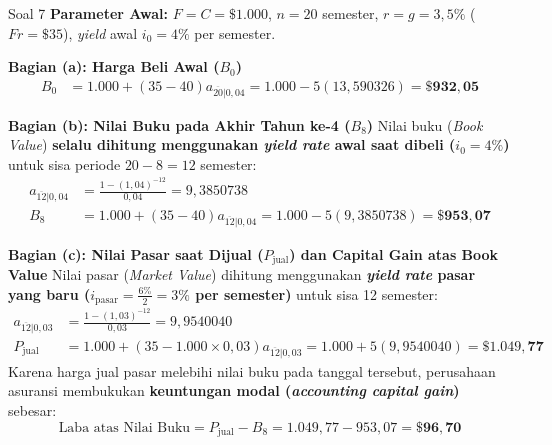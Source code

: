 \documentclass[11pt,a4paper]{article}
\begin{document}
\begin{solutionbox}{Soal 7}
\textbf{Parameter Awal:} $F = C = \$1.000$, $n = 20$ semester, $r = g = 3{,}5\%$ ($Fr = \$35$), \textit{yield} awal $i_0 = 4\%$ per semester.

\textbf{Bagian (a): Harga Beli Awal ($B_0$)}
\begin{align*}
    B_0 &= 1.000 + (35 - 40) a_{\overline{20}|0{,}04} = 1.000 - 5(13{,}590326) = \mathbf{\$932{,}05}
\end{align*}

\textbf{Bagian (b): Nilai Buku pada Akhir Tahun ke-4 ($B_8$)}
Nilai buku (\textit{Book Value}) \textbf{selalu dihitung menggunakan \textit{yield rate} awal saat dibeli ($i_0 = 4\%$)} untuk sisa periode $20 - 8 = 12$ semester:
\begin{align*}
    a_{\overline{12}|0{,}04} &= \frac{1 - (1{,}04)^{-12}}{0{,}04} = 9{,}3850738 \\[0.2em]
    B_8 &= 1.000 + (35 - 40) a_{\overline{12}|0{,}04} = 1.000 - 5(9{,}3850738) = \mathbf{\$953{,}07}
\end{align*}

\textbf{Bagian (c): Nilai Pasar saat Dijual ($P_{\text{jual}}$) dan Capital Gain atas Book Value}
Nilai pasar (\textit{Market Value}) dihitung menggunakan \textbf{\textit{yield rate} pasar yang baru ($i_{\text{pasar}} = \frac{6\%}{2} = 3\%$ per semester)} untuk sisa 12 semester:
\begin{align*}
    a_{\overline{12}|0{,}03} &= \frac{1 - (1{,}03)^{-12}}{0{,}03} = 9{,}9540040 \\[0.2em]
    P_{\text{jual}} &= 1.000 + (35 - 1.000 \times 0{,}03) a_{\overline{12}|0{,}03} = 1.000 + 5(9{,}9540040) = \mathbf{\$1.049{,}77}
\end{align*}
Karena harga jual pasar melebihi nilai buku pada tanggal tersebut, perusahaan asuransi membukukan \textbf{keuntungan modal (\textit{accounting capital gain})} sebesar:
\begin{equation*}
    \text{Laba atas Nilai Buku} = P_{\text{jual}} - B_8 = 1.049{,}77 - 953{,}07 = \mathbf{\$96{,}70}
\end{equation*}
\end{solutionbox}

\vspace{1.2em}
\end{document}
